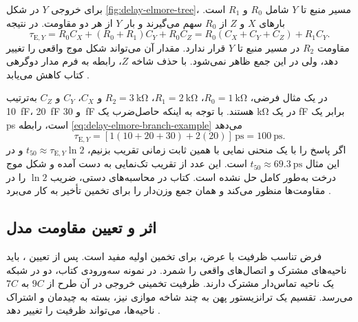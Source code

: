 برای خروجی \(Y\) در شکل \ref{fig:delay-elmore-tree}، مسیر منبع
تا \(Y\) شامل \(R_0\) و \(R_1\) است. بارهای \(X\) و \(Z\)
از \(R_0\) سهم می‌گیرند و بار \(Y\) از هر دو مقاومت. در نتیجه
\begin{equation}
  \tau_{\mathrm{E},Y}
    =R_0C_X+(R_0+R_1)C_Y+R_0C_Z
    =R_0(C_X+C_Y+C_Z)+R_1C_Y.
  \label{eq:delay-elmore-branch-example}
\end{equation}
مقاومت \(R_2\) در مسیر منبع تا \(Y\) قرار ندارد. مقدار آن
می‌تواند شکل موج واقعی را تغییر دهد، ولی در این جمع ظاهر
نمی‌شود. با حذف شاخه \(Z\)، رابطه به فرم مدار دوگرهی کتاب
کاهش می‌یابد \cite[شکل  و مثال
، صفحات ۱۴۹ و ۱۵۰]{weste}.

در یک مثال فرضی، \(R_0=\qty{1}{\kilo\ohm}\)،
\(R_1=\qty{2}{\kilo\ohm}\)، \(R_2=\qty{3}{\kilo\ohm}\) و
\(C_X\)، \(C_Y\) و \(C_Z\) به‌ترتیب \qty{10}{\femto\farad}،
\qty{20}{\femto\farad} و \qty{30}{\femto\farad} هستند. با
توجه به اینکه حاصل‌ضرب یک \unit{\kilo\ohm} در یک
\unit{\femto\farad} برابر یک \unit{\pico\second} است، رابطه
\eqref{eq:delay-elmore-branch-example} می‌دهد
\[
  \tau_{\mathrm{E},Y}
    =[1(10+20+30)+2(20)]\,\unit{\pico\second}
    =\qty{100}{\pico\second}.
\]
اگر پاسخ را با یک منحنی نمایی با همین ثابت زمانی تقریب بزنیم،
\(t_{50}\approx\tau_{\mathrm{E},Y}\ln 2\) و در این مثال
\(t_{50}\approx\qty{69.3}{\pico\second}\) است. این عدد
از تقریب تک‌نمایی به دست آمده و شکل موج درخت به‌طور کامل حل
نشده است. کتاب در محاسبه‌های دستی، ضریب \(\ln 2\) را در
مقاومت‌ها منظور می‌کند و همان جمع وزن‌دار را برای تخمین تأخیر
به کار می‌برد \cite[بخش‌های  و
، صفحات ۱۴۹ و ۱۵۰]{weste}.

\subsection{اثر  و تعیین مقاومت مدل}
\label{sec:delay-rc-calibration}

فرض تناسب ظرفیت  با عرض، برای تخمین اولیه مفید
است. پس از تعیین ، باید ناحیه‌های مشترک و اتصال‌های
واقعی را شمرد. در نمونه  سه‌ورودی کتاب، دو 
در شبکه  یک ناحیه تماس‌دار مشترک دارند. ظرفیت تخمینی
خروجی در آن طرح از \(9C\) به \(7C\) می‌رسد. تقسیم یک ترانزیستور
پهن به چند شاخه موازی نیز، بسته به چیدمان و اشتراک ناحیه‌ها،
می‌تواند ظرفیت را تغییر دهد \cite[بخش  و
شکل‌های  و ، صفحات ۱۵۳ و ۱۵۴]{weste}.

